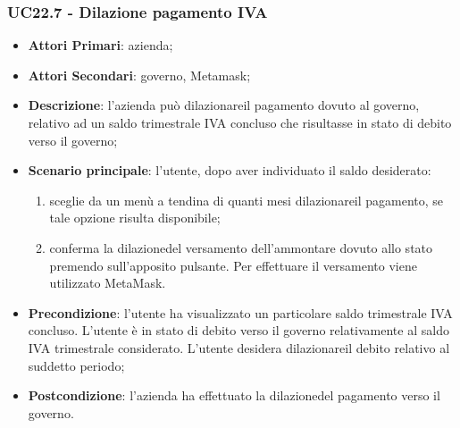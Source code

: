 \subsubsection{UC22.7 - Dilazione pagamento IVA}
\begin{itemize}
	\item \textbf{Attori Primari}: azienda;
	\item \textbf{Attori Secondari}: governo, Metamask\glo;
	\item \textbf{Descrizione}: l'azienda può dilazionare\glosp il pagamento dovuto al governo, relativo ad un saldo trimestrale IVA concluso che risultasse in stato di debito verso il governo;
	\item \textbf{Scenario principale}: l'utente, dopo aver individuato il saldo desiderato:
	\begin{enumerate}[label=\alph*.]
		\item sceglie da un menù a tendina di quanti mesi dilazionare\glosp il pagamento, se tale opzione risulta disponibile;
		\item conferma la dilazione\glosp del versamento dell'ammontare dovuto allo stato premendo sull'apposito pulsante. Per effettuare il versamento viene utilizzato MetaMask\glo.
	\end{enumerate}
	\item \textbf{Precondizione}: l'utente ha visualizzato un particolare saldo trimestrale IVA concluso. L'utente è in stato di debito verso il governo relativamente al saldo IVA trimestrale considerato. L'utente desidera dilazionare\glosp il debito relativo al suddetto periodo; 
	\item \textbf{Postcondizione}: l'azienda ha effettuato la dilazione\glosp del pagamento verso il governo.
\end{itemize} 







